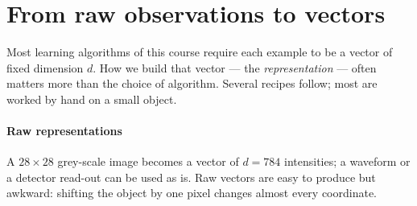 \documentclass[11pt]{article}
\begin{document}
\section{From raw observations to vectors}\label{sec:raw}

Most learning algorithms of this course require each example to be a vector of fixed dimension $d$. How we build that
vector --- the \emph{representation} --- often matters more than the choice of algorithm. Several recipes follow;
most are worked by hand on a small object.

\paragraph{Raw representations} A $28 \times 28$ grey-scale image becomes a vector of $d = 784$ intensities; a waveform
or a detector read-out can be used as is. Raw vectors are easy to produce but awkward: shifting the object by one
pixel changes almost every coordinate.
\end{document}
